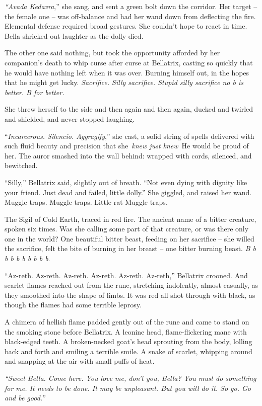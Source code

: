 \emph{``Avada Kedavra},'' she sang, and sent a green bolt down the
corridor. Her target -- the female one -- was off-balance and had her
wand down from deflecting the fire. Elemental defense required broad
gestures. She couldn't hope to react in time. Bella shrieked out
laughter as the dolly died.

The other one said nothing, but took the opportunity afforded by her
companion's death to whip curse after curse at Bellatrix, casting so
quickly that he would have nothing left when it was over. Burning
himself out, in the hopes that he might get lucky. \emph{Sacrifice.
Silly sacrifice. Stupid silly sacrifice no b is better. B for better.}

She threw herself to the side and then again and then again, ducked and
twirled and shielded, and never stopped laughing.

``\emph{Incarcerous. Silencio. Aggragify},'' she cast, a solid string of
spells delivered with such fluid beauty and precision that
she~\emph{knew just knew}~He would be proud of her. The auror smashed
into the wall behind: wrapped with cords, silenced, and bewitched.

``Silly,'' Bellatrix said, slightly out of breath. ``Not even dying with
dignity like your friend. Just dead and failed, little dolly.'' She
giggled, and raised her wand. Muggle traps. Muggle traps. Little rat
Muggle traps.

The Sigil of Cold Earth, traced in red fire. The ancient name of a
bitter creature, spoken six times. Was she calling some part of that
creature, or was there only one in the world? One beautiful bitter
beast, feeding on her sacrifice -- she willed the sacrifice, felt the
bite of burning in her breast -- one bitter burning beast. \emph{B b b b
b b b b b b}.

``Az-reth. Az-reth. Az-reth. Az-reth. Az-reth. Az-reth,'' Bellatrix
crooned. And scarlet flames reached out from the rune, stretching
indolently, almost casually, as they smoothed into the shape of limbs.
It was red all shot through with black, as though the flames had some
terrible leprosy.

A chimera of hellish flame padded gently out of the rune and came to
stand on the smoking stone before Bellatrix. A leonine head,
flame-flickering mane with black-edged teeth. A broken-necked goat's
head sprouting from the body, lolling back and forth and smiling a
terrible smile. A snake of scarlet, whipping around and snapping at the
air with small puffs of heat.

\emph{``Sweet Bella. Come here. You love me, don't you, Bella? You must
do something for me. It needs to be done. It may be unpleasant. But you
will do it. So go. Go and be good.''}

